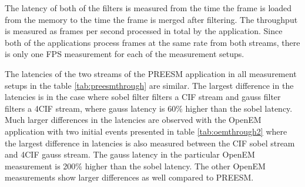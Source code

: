 The latency of both of the filters is measured from the time the frame is loaded from the memory to the time the frame is merged after filtering. The throughput is measured as frames per second processed in total by the application. Since both of the applications process frames at the same rate from both streams, there is only one FPS measurement for each of the measurement setups. 

The latencies of the two streams of the PREESM application in all measurement setups in the table \ref{tab:preesmthrough} are similar. The largest difference in the latencies is in the case where sobel filter filters a CIF stream and gauss filter filters a 4CIF stream, where gauss latency is 60\% higher than the sobel latency. Much larger differences in the latencies are observed with the OpenEM application with two initial events presented in table \ref{tab:oemthrough2} where the largest difference in latencies is also measured between the CIF sobel stream and 4CIF gauss stream. The gauss latency in the particular OpenEM measurement is 200\% higher than the sobel latency. The other OpenEM measurements show larger differences as well compared to PREESM.


